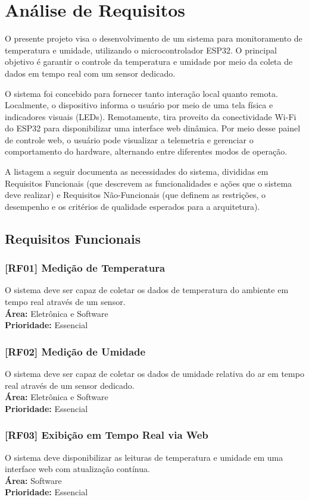 \section{Análise de Requisitos}

O presente projeto visa o desenvolvimento de um sistema para monitoramento de temperatura e umidade, utilizando o microcontrolador ESP32. O principal objetivo é garantir o controle da temperatura e umidade por meio da coleta de dados em tempo real com um sensor dedicado.

O sistema foi concebido para fornecer tanto interação local quanto remota. Localmente, o dispositivo informa o usuário por meio de uma tela física e indicadores visuais (LEDs). Remotamente, tira proveito da conectividade Wi-Fi do ESP32 para disponibilizar uma interface web dinâmica. Por meio desse painel de controle web, o usuário pode visualizar a telemetria e gerenciar o comportamento do hardware, alternando entre diferentes modos de operação.

A listagem a seguir documenta as necessidades do sistema, divididas em Requisitos Funcionais (que descrevem as funcionalidades e ações que o sistema deve realizar) e Requisitos Não-Funcionais (que definem as restrições, o desempenho e os critérios de qualidade esperados para a arquitetura).

\subsection{Requisitos Funcionais}
\subsubsection{[RF01] Medição de Temperatura}
O sistema deve ser capaz de coletar os dados de temperatura do ambiente em tempo real através de um sensor. \\
\textbf{Área:} Eletrônica e Software \\
\textbf{Prioridade:} Essencial

\subsubsection{[RF02] Medição de Umidade}
O sistema deve ser capaz de coletar os dados de umidade relativa do ar em tempo real através de um sensor dedicado. \\
\textbf{Área:} Eletrônica e Software \\
\textbf{Prioridade:} Essencial

\subsubsection{[RF03] Exibição em Tempo Real via Web}
O sistema deve disponibilizar as leituras de temperatura e umidade em uma interface web com atualização contínua. \\
\textbf{Área:} Software \\
\textbf{Prioridade:} Essencial

